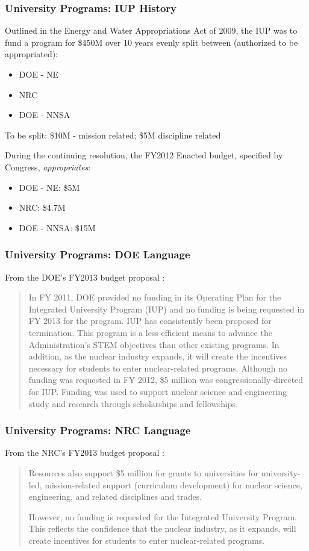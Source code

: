 \begin{frame}[ctb!]
  \frametitle{University Programs: IUP History}
  Outlined in the Energy and Water Appropriations Act of
  2009, the IUP was to fund a program for \$450M over 10 
  years evenly split between (authorized to be appropriated):
  \begin{itemize}
    \item DOE - NE
    \item NRC
    \item DOE - NNSA
  \end{itemize}
  To be split: \$10M - mission related; \$5M discipline related
  \vspace{0.4cm}
  \pause
  
  During the continuing resolution, the FY2012 Enacted budget,
  specified by Congress, \emph{appropriates}:
  \begin{itemize}
    \item DOE - NE: \$5M
    \item NRC: \$4.7M
    \item DOE - NNSA: \$15M
  \end{itemize}
\end{frame}


\begin{frame}[ctb!]
  \frametitle{University Programs: DOE Language}  
  From the DOE's FY2013 budget proposal \cite{doe_budget_2013}:
  \begin{quote}
    In FY 2011, DOE provided no funding in its Operating Plan 
    for the Integrated University Program (IUP) and no funding 
    is being requested in FY 2013 for the program.  IUP has 
    consistently been proposed for termination.  This program is 
    a less efficient means to advance the Administration’s STEM 
    objectives than other existing programs.  In addition, as the 
    nuclear industry expands, it will create the incentives 
    necessary for students to enter nuclear-related programs. 
    Although no funding was requested in FY 2012, \$5 million was 
    congressionally-directed for IUP.  Funding was used to support 
    nuclear science and engineering study and research through 
    scholarships and fellowships. 
  \end{quote}
\end{frame}

\begin{frame}[ctb!]
  \frametitle{University Programs: NRC Language}  
  From the NRC's FY2013 budget proposal \cite{nrc_budget_2013}:
  \begin{quote}
    Resources also support \$5 million for grants to universities 
    for university-led, mission-related support (curriculum development) 
    for nuclear science, engineering, and related disciplines and trades.

    However, no funding is requested for the Integrated University Program.  
    This reflects the confidence that the nuclear industry, as it expands, 
    will create incentives for students to enter nuclear-related programs.
  \end{quote}
\end{frame}

